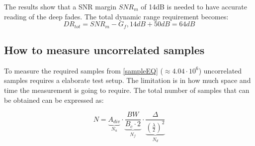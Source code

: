 The results show that a SNR margin $SNR_m$ of 14dB is needed to have accurate reading of the deep fades.
The total dynamic range requirement becomes:
\begin{equation}
DR_{tot} = SNR_m - G_f , 14dB + 50dB = 64dB 
\end{equation}
\begin{where}
\end{where}


\subsection{How to measure uncorrelated samples}
\label{howtomeasureUS}
To measure the required samples from \autoref{sampleEQ} ($\approx 4.04\cdot10^6$) uncorrelated samples requires a elaborate test setup. The limitation is in how much space and time the measurement is going to require. The total number of samples that can be obtained can be expressed as: 

\begin{equation}
N = \underbrace{A_{div}}_\text{$N_a$} \cdot \underbrace{\frac{BW}{B_c \cdot 2}}_\text{$N_f$} \cdot \underbrace{\frac{\Delta}{(\frac{\lambda}{2})^2}}_\text{$N_d$}
\label{howtosample}
\end{equation} 
 
\begin{where}
\end{where} 
 
